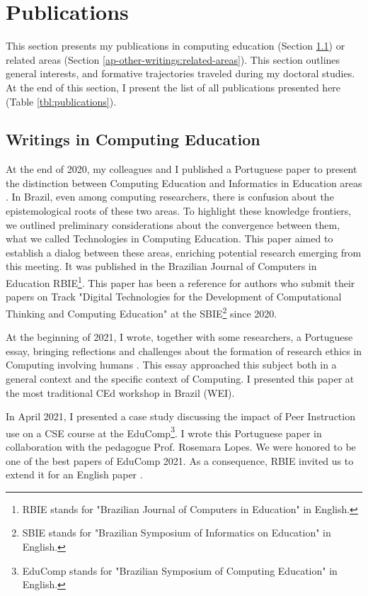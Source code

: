 \chapter{Publications}
\label{chap:appendix-a}

This section presents my publications in computing education (Section \ref{ap-other-writings:comp-ed}) or related areas (Section \ref{ap-other-writings:related-areas}). This section outlines general interests, and formative trajectories traveled during my doctoral studies. At the end of this section, I present the list of all publications presented here (Table \ref{tbl:publications}).

\section{Writings in Computing Education}
\label{ap-other-writings:comp-ed}

At the end of 2020, my colleagues and I published a Portuguese paper to present the distinction between Computing Education and Informatics in Education areas \cite{bispojr:2020-tec}. In Brazil, even among computing researchers, there is confusion about the epistemological roots of these two areas. To highlight these knowledge frontiers, we outlined preliminary considerations about the convergence between them, what we called Technologies in Computing Education. This paper aimed to establish a dialog between these areas, enriching potential research emerging from this meeting. It was published in the Brazilian Journal of Computers in Education \gls{RBIE}\footnote{RBIE stands for "Brazilian Journal of Computers in Education" in English.}. This paper has been a reference for authors who submit their papers on Track "Digital Technologies for the Development of Computational Thinking and Computing Education" at the \gls{SBIE}\footnote{SBIE stands for "Brazilian Symposium of Informatics on Education" in English.} since 2020.

At the beginning of 2021, I wrote, together with some researchers, a Portuguese essay, bringing reflections and challenges about the formation of research ethics in Computing involving humans \cite{bispojr:2021-wei}. This essay approached this subject both in a general context and the specific context of Computing. I presented this paper at the most traditional \acrfull{CEd} workshop in Brazil (\gls{WEI}).

In April 2021, I presented a case study discussing the impact of Peer Instruction use on a \acrfull{CSE} course \cite{bispojr:2021-educomp} at the \gls{EduComp}\footnote{EduComp stands for "Brazilian Symposium of Computing Education" in English.}. I wrote this Portuguese paper in collaboration with the pedagogue Prof. Rosemara Lopes. We were honored to be one of the best papers of \gls{EduComp} 2021. As a consequence, \gls{RBIE} invited us to extend it for an English paper \cite{bispojr:2021}. 

